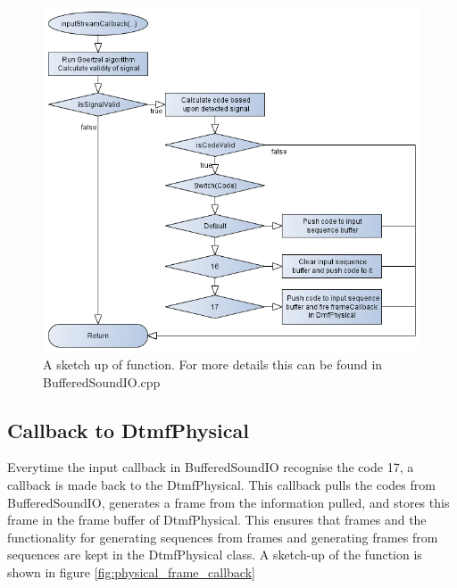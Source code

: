		\begin{figure}[htb]
			\begin{center}
			\includegraphics[scale=0.7,trim=0 0 0 0]{content/graphics/physical/physical_input_callback.png}%
			\caption{A sketch up of  function. For more details this can be found in BufferedSoundIO.cpp}
			\label{fig:physical_input_callback}
			\end{center}
		\end{figure}
		
	\subsection{Callback to DtmfPhysical}
	Everytime the input callback in BufferedSoundIO recognise the code 17, a callback is made back to the DtmfPhysical. This callback pulls the
	codes from BufferedSoundIO, generates a frame from the information pulled, and stores this frame in the frame buffer of DtmfPhysical. This ensures
	that frames and the functionality for generating sequences from frames and generating frames from sequences are kept in the DtmfPhysical class.
	A sketch-up of the function is shown in figure \ref{fig:physical_frame_callback}
	
